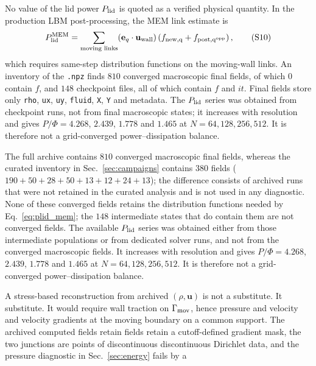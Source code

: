 \documentclass[11pt]{article}
\begin{document}
No value of the lid power $P_{\rm lid}$ is quoted as a verified physical
quantity. In the production LBM post-processing, the MEM link estimate is
\[
  P_{\rm lid}^{\rm MEM}=\sum_{\text{moving links}}
  (\mathbf{e}_q\cdot\mathbf{u}_{\rm wall})
  \left(f_{\rm new,q}+f_{\rm post,q^{\rm opp}}\right),
  \tag{S10}
  \label{eq:plid_mem}
\]
which requires same-step distribution functions on the moving-wall links. \color{revred}An inventory of the \texttt{.npz} finds $810$ converged macroscopic final fields, of which $0$ contain $f$, and $148$ checkpoint files, all of which contain $f$ and $it$. Final fields store only \texttt{rho}, \texttt{ux}, \texttt{uy}, \texttt{fluid}, \texttt{X}, \texttt{Y} and metadata. The $P_{\rm lid}$ series was obtained from checkpoint runs, not from final macroscopic states; it increases with resolution and gives $P/\Phi=4.268$, $2.439$, $1.778$ and $1.465$ at $N=64,128,256,512$. It is therefore not a grid-converged power--dissipation balance.\par
\color{revblue}The full archive contains $810$ converged macroscopic final fields, whereas the curated inventory in Sec.~\ref{sec:campaigns} contains $380$ fields ($190+50+28+50+13+12+24+13$); the difference consists of archived runs that were not retained in the curated analysis and is not used in any diagnostic. None of these converged fields retains the distribution functions needed by Eq.~\eqref{eq:plid_mem}; the $148$ intermediate states that do contain them are not converged fields. The available $P_{\rm lid}$ series was obtained either from those intermediate populations or from dedicated solver runs, and not from the converged macroscopic fields. It increases with resolution and gives $P/\Phi=4.268$, $2.439$, $1.778$ and $1.465$ at $N=64,128,256,512$. It is therefore not a grid-converged power--dissipation balance.\par
\color{black}
A stress-based reconstruction from \color{revred}archived \color{black}$(\rho,\mathbf{u})$ is not a\color{revblue} substitute. It\color{black}
\color{revred}substitute. It \color{black}would require wall traction on $\Gamma_{\rm mov}$, hence pressure\color{revblue} and velocity\color{black}
\color{revred}and velocity \color{black}gradients at the moving boundary on a common support. The \color{revred}archived \color{revblue}computed fields retain\color{black}
\color{revred}fields retain \color{black}a cutoff-defined gradient mask, the two junctions are points of\color{revblue} discontinuous\color{black}
\color{revred}discontinuous \color{black}Dirichlet data, and the pressure diagnostic in\color{revblue} Sec.~\ref{sec:energy} fails by a\color{black}
\end{document}
